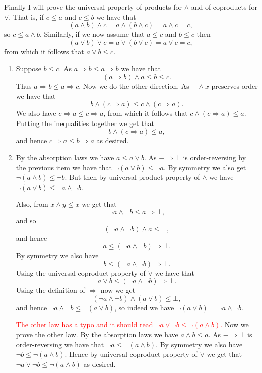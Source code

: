 \documentclass{article}
\theoremstyle{plain}
\begin{document}
\begin{enumerate}
		Finally I will prove the universal property of products for $\wedge$ and of coproducts for $\vee$. That is, if $c\leq a$ and $c\leq b$ we have that 
		\[
			(a \wedge b) \wedge c = a \wedge (b \wedge c) = a\wedge c = c,
		\]
		so $c\leq a\wedge b$. Similarly, if we now assume that $a\leq c$ and $b\leq c$ then
		\[
			(a \vee b) \vee c = a\vee (b \vee c) = a \vee c = c,
		\]
		from which it follows that $a \vee b \leq c$.
		\begin{enumerate}
			\item Suppose $b\leq c$. As $a \Rightarrow b \leq a \Rightarrow b$ we have that
			\[
				(a\Rightarrow b) \wedge a \leq b \leq c.
			\]
			Thus $a\Rightarrow b \leq a\Rightarrow c$. Now we do the other direction. As $- \wedge x$ preserves order we have that
			\[
				b \wedge (c \Rightarrow a) \leq c \wedge (c \Rightarrow a).
			\]
			We also have $c \Rightarrow a \leq c \Rightarrow a$, from which it follows that $c \wedge (c \Rightarrow a) \leq a$. Putting the inequalities together we get that 
			\[
				b \wedge (c \Rightarrow a) \leq a,
			\]
			and hence $c\Rightarrow a \leq b \Rightarrow a$ as desired.
			\item By the absorption laws we have $a \leq a \vee b$. As $- \Rightarrow \bot$ is order-reversing by the previous item we have that $\neg(a\vee b) \leq \neg a$. By symmetry we also get $\neg (a\wedge b) \leq \neg b$. But then by universal product property of $\wedge$ we have $\neg (a\vee b) \leq \lnot a \wedge \lnot b$. 
			
			Also, from $x\wedge y \leq x$ we get that 
			\[
				\lnot a \wedge \lnot b \leq a \Rightarrow \bot,
			\]
			and so
			\[
				(\lnot a \wedge \lnot b ) \wedge a \leq \bot,
			\]
			and hence
			\[
				a \leq (\lnot a \wedge \lnot b) \Rightarrow \bot. 
			\]
			By symmetry we also have
			\[
				b \leq (\lnot a \wedge \lnot b) \Rightarrow \bot.
			\]
			Using the universal coproduct property of $\vee$ we have that 
			\[
				a \vee b \leq (\lnot a \wedge \lnot b) \Rightarrow \bot.
			\]
			Using the definition of $\Rightarrow$ now we get 
			\[
				(\lnot a \wedge \lnot b) \wedge (a\vee b) \leq \bot,
			\]
			and hence $\lnot a \wedge \lnot b \leq \neg (a\vee b)$, so indeed we have $\neg (a\vee b) = \lnot a \wedge \lnot b$. 
			
			\textcolor{red}{The other law has a typo and it should read $\neg a \vee \neg b \leq \neg (a\wedge b)$.} Now we prove the other law. By the absorption laws we have $a\wedge b \leq a$. As $- \Rightarrow \bot$ is order-reversing we have that $\neg a \leq \neg(a\wedge b)$. By symmetry we also have $\neg b \leq \neg(a\wedge b)$. Hence by universal coproduct property of $\vee$ we get that $\neg a \vee \neg b \leq \neg (a\wedge b)$ as desired.
			

\end{enumerate}
\end{enumerate}
\end{document}
